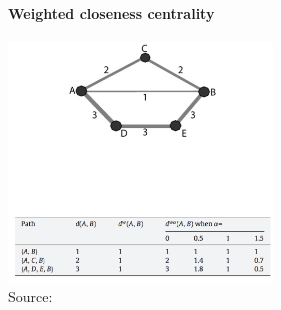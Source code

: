\documentclass[8pt]{beamer}
\begin{document}
\begin{frame}
\frametitle{\insertsection}
\framesubtitle{Weighted closeness centrality}

\centering  
\includegraphics[width=7cm]{distancew.png}\\
\tiny Source: \cite{Opsahl2010}	

\end{frame}

\end{document}
